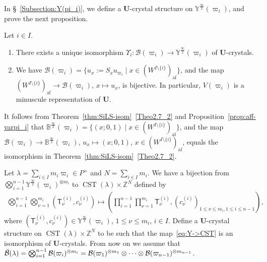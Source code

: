 \documentclass[ALCO,ThmDefs,Unicode,epreuves]{cedram}
\newcommand{\BZ}{\mathbb{Z}}
\renewcommand{\U}{\mathbf{U}}
\newcommand{\si}{\frac{\infty}{2}}
\DeclareMathOperator{\af}{af}
\DeclareMathOperator{\CST}{CST}
\begin{document}
In \S~\ref{Subsection:Y(pi_i)}, 
we define a $\U$-crystal structure on 
$\mathbb{Y}^{\si}(\varpi_i)$, 
and prove the next proposition. 

\begin{prop} \label{prop:aff-varpi_i}
Let $i \in I$.
\begin{enumerate}[label=(\arabic*)]
\item\label{Prop4.3_1}
There exists a unique isomorphism
$\Upsilon_i : \mathcal{B}(\varpi_i) \rightarrow \mathbb{Y}^{\si}(\varpi_i)$
of $\U$-crystals. 
\item\label{Prop4.3_2}
We have 
$\mathcal{B}(\varpi_i) = \{ u_x := S_x u_{\varpi_i} \mid x \in (W^{I \setminus \{ i \}})_{\af} \}$, 
and the map 
$(W^{I \setminus \{ i \}})_{\af} \rightarrow \mathcal{B}(\varpi_i)$, $x \mapsto u_x$, 
is bijective. In particular, 
$V(\varpi_i)$ 
is a minuscule representation of $\U$. 
\end{enumerate}
\end{prop}

\begin{rema} \label{rem:aff-varpi_i}
It follows from Theorem~\ref{thm:SiLS-isom}~\ref{Theo2.7_2} and Proposition~\ref{prop:aff-varpi_i} that 
$\mathbb{B}^{\si}(\varpi_i) = \{ (x ; 0,1) \mid x \in (W^{I \setminus \{ i \}})_{\af} \}$, 
and the map 
$\mathcal{B}(\varpi_i) \rightarrow \mathbb{B}^{\si}(\varpi_i)$, 
$u_x \mapsto (x;0,1)$, 
$x \in (W^{I \setminus \{ i \}})_{\af}$, 
equals the isomorphism in Theorem~\ref{thm:SiLS-isom}~\ref{Theo2.7_2}.
\end{rema}

Let 
$\lambda = \sum_{i \in I} m_i \varpi_i \in P^+$
and 
$N = \sum_{i \in I} m_i$. 
We have a bijection from 
$\bigotimes_{i=1}^{n-1} \mathbb{Y}^{\si}(\varpi_i)^{\otimes m_i}$
to
$\CST (\lambda) \times \BZ^N$
defined by
\begin{align} \label{eq:Y->CST}
\bigotimes_{i=1}^{n-1} \bigotimes_{\nu = 1}^{m_i} 
\left( \mathsf{T}_{\nu}^{(i)} , c_{\nu}^{(i)} \right)
\longmapsto 
\left(
\prod_{i=1}^{n-1} \prod_{\nu = 1}^{m_i}
\mathsf{T}_{\nu}^{(i)} , 
(c_{\nu}^{(i)})_{1 \leq \nu \leq m_i , 1 \leq i \leq n-1}
\right) ,
\end{align}
where 
$(\mathsf{T}_{\nu}^{(i)} , c_{\nu}^{(i)}) \in \mathbb{Y}^{\si}(\varpi_i)$, 
$1 \leq \nu \leq m_i$, $i \in I$. 
Define a $\U$-crystal structure on 
$\CST (\lambda) \times \BZ^N$ 
to be such that the map~\eqref{eq:Y->CST} is an isomorphism of $\U$-crystals. 
From now on we assume that 
$\Breve{\mathcal{B}}(\lambda) 
=
\bigotimes_{i=1}^{n-1} \mathcal{B}(\varpi_i)^{\otimes m_i}
=
\mathcal{B}(\varpi_1)^{\otimes m_1} \otimes \cdots \otimes \mathcal{B}(\varpi_{n-1})^{\otimes m_{n-1}}$.
\end{document}
